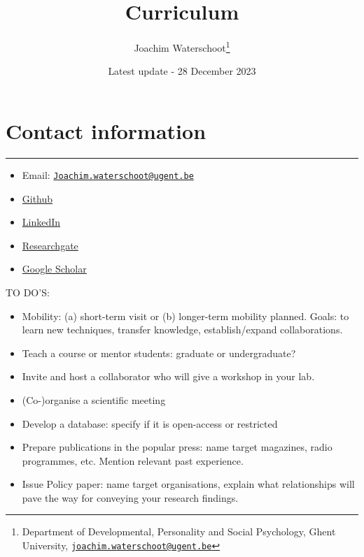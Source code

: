 \documentclass[
  twocolumn]{article}
\title{Curriculum}
\author{Joachim Waterschoot\footnote{Department of Developmental,
  Personality and Social Psychology, Ghent University,
  \href{mailto:joachim.waterschoot@ugent.be}{\nolinkurl{joachim.waterschoot@ugent.be}}}}
\date{Latest update - 28 December 2023}
\providecommand{\tightlist}{%
  \setlength{\itemsep}{0pt}\setlength{\parskip}{0pt}}
\begin{document}
\maketitle

{
\setcounter{tocdepth}{2}
\tableofcontents
}
\selectfont

\hypertarget{contact-information}{%
\section{\texorpdfstring{Contact information
}{Contact information }}\label{contact-information}}

\begin{center}\rule{0.5\linewidth}{0.5pt}\end{center}

\begin{itemize}
\tightlist
\item
  Email:
  \href{mailto:Joachim.waterschoot@ugent.be}{\nolinkurl{Joachim.waterschoot@ugent.be}}\\
\item
  \href{https://github.com/Watjoa}{Github}\\
\item
  \href{https://www.linkedin.com/in/watjoa}{LinkedIn}\\
\item
  \href{https://www.researchgate.net/profile/Joachim_Waterschoot}{Researchgate}\\
\item
  \href{https://scholar.google.com/citations?user=F-fOgBoAAAAJ\&hl=nl}{Google
  Scholar}
\end{itemize}

TO DO'S:

\begin{itemize}
\tightlist
\item
  Mobility: (a) short-term visit or (b) longer-term mobility planned.
  Goals: to learn new techniques, transfer knowledge, establish/expand
  collaborations.\\
\item
  Teach a course or mentor students: graduate or undergraduate?\\
\item
  Invite and host a collaborator who will give a workshop in your lab.\\
\item
  (Co-)organise a scientific meeting\\
\item
  Develop a database: specify if it is open-access or restricted\\
\item
  Prepare publications in the popular press: name target magazines,
  radio programmes, etc. Mention relevant past experience.\\
\item
  Issue Policy paper: name target organisations, explain what
  relationships will pave the way for conveying your research findings.
\end{itemize}
\end{document}
